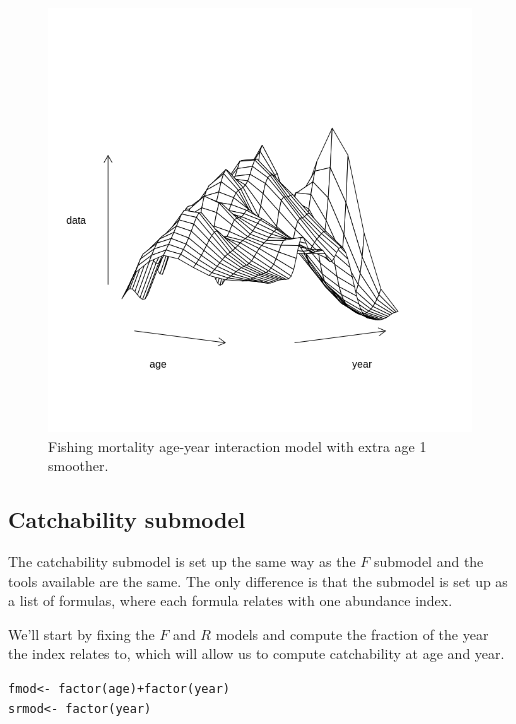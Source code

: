 \documentclass[a4paper,english,10pt]{article}\usepackage[]{graphicx}\usepackage[]{color}
\makeatletter
\newcommand{\hlopt}[1]{\textcolor[rgb]{0.196,0.196,0.196}{#1}}%
\newcommand{\hlstd}[1]{\textcolor[rgb]{0.196,0.196,0.196}{#1}}%
\newcommand{\hlkwb}[1]{\textcolor[rgb]{0.627,0,0.314}{#1}}%
\newcommand{\hlkwd}[1]{\textcolor[rgb]{0.78,0.227,0.412}{#1}}%
\newenvironment{kframe}{%
 \def\at@end@of@kframe{}%
 \ifinner\ifhmode%
  \def\at@end@of@kframe{\end{minipage}}%
  \begin{minipage}{\columnwidth}%
 \fi\fi%
 \def\FrameCommand##1{\hskip\@totalleftmargin \hskip-\fboxsep
 \colorbox{shadecolor}{##1}\hskip-\fboxsep
     \hskip-\linewidth \hskip-\@totalleftmargin \hskip\columnwidth}%
 \MakeFramed {\advance\hsize-\width
   \@totalleftmargin\z@ \linewidth\hsize
   \@setminipage}}%
 {\par\unskip\endMakeFramed%
 \at@end@of@kframe}
\newenvironment{knitrout}{}{} %
\makeatother
\begin{document}
\begin{knitrout}
\color{fgcolor}\begin{figure}[H]

{\centering \includegraphics[width=.9\linewidth]{figure/age1-1} 

}

\caption[Fishing mortality age-year interaction model with extra age 1 smoother]{Fishing mortality age-year interaction model with extra age 1 smoother.}\label{fig:age1}
\end{figure}


\end{knitrout}

\subsection{Catchability submodel}

The catchability submodel is set up the same way as the $F$ submodel and the tools available are the same. The only difference is that the submodel is set up as a list of formulas, where each formula relates with one abundance index.

We'll start by fixing the $F$ and $R$ models and compute the fraction of the year the index relates to, which will allow us to compute catchability at age and year.

\begin{knitrout}
\color{fgcolor}\begin{kframe}
\begin{alltt}
\hlstd{fmod} \hlkwb{<-} \hlopt{~}\hlkwd{factor}\hlstd{(age)} \hlopt{+} \hlkwd{factor}\hlstd{(year)}
\hlstd{srmod} \hlkwb{<-} \hlopt{~}\hlkwd{factor}\hlstd{(year)}
\end{alltt}
\end{kframe}
\end{knitrout}
\end{document}
